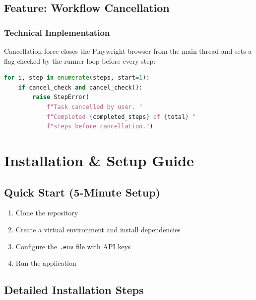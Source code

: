 \documentclass[12pt,a4paper]{article}
\begin{document}
\subsection{Feature: Workflow Cancellation}
\label{subsec:feature-cancel}

\subsubsection{Technical Implementation}
Cancellation force-closes the Playwright browser from the main thread and sets a flag checked by the runner loop before every step:

\begin{lstlisting}[language=Python, caption={Cancel Check in Runner Loop}, label={lst:cancel}]
for i, step in enumerate(steps, start=1):
    if cancel_check and cancel_check():
        raise StepError(
            f"Task cancelled by user. "
            f"Completed {completed_steps} of {total} "
            f"steps before cancellation.")
\end{lstlisting}

\section{Installation \& Setup Guide}
\label{sec:installation}

\subsection{Quick Start (5-Minute Setup)}
\label{subsec:quick-start}

\begin{enumerate}[leftmargin=2em]
  \item Clone the repository
  \item Create a virtual environment and install dependencies
  \item Configure the \texttt{.env} file with API keys
  \item Run the application
\end{enumerate}

\subsection{Detailed Installation Steps}
\label{subsec:detailed-install}
\end{document}
